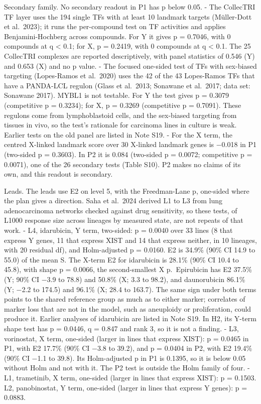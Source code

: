 \documentclass[
  11pt,
  letterpaper,
]{article}
\begin{document}
Secondary family. No secondary readout in P1 has p below 0.05. - The
CollecTRI TF layer uses the 194 single TFs with at least 10 landmark
targets (Müller-Dott et al.~2023); it runs the per-compound test on TF
activities and applies Benjamini-Hochberg across compounds. For Y it
gives p = 0.7046, with 0 compounds at q \textless{} 0.1; for X, p =
0.2419, with 0 compounds at q \textless{} 0.1. The 25 CollecTRI
complexes are reported descriptively, with panel statistics of 0.546 (Y)
and 0.653 (X) and no p value. - The focused one-sided test of TFs with
sex-biased targeting (Lopes-Ramos et al.~2020) uses the 42 of the 43
Lopes-Ramos TFs that have a PANDA-LCL regulon (Glass et al.~2013;
Sonawane et al.~2017; data set: Sonawane 2017). MYBL1 is not testable.
For Y the test gives p = 0.3079 (competitive p = 0.3234); for X, p =
0.3269 (competitive p = 0.7091). These regulons come from lymphoblastoid
cells, and the sex-biased targeting from tissues in vivo, so the test's
rationale for carcinoma lines in culture is weak. Earlier tests on the
old panel are listed in Note S19. - For the X term, the centred X-linked
landmark score over 30 X-linked landmark genes is −0.018 in P1
(two-sided p = 0.3603). In P2 it is 0.084 (two-sided p = 0.0072;
competitive p = 0.0071), one of the 26 secondary tests (Table S10). P2
makes no claims of its own, and this readout is secondary.

Leads. The leads use E2 on level 5, with the Freedman-Lane p, one-sided
where the plan gives a direction. Saha et al.~2024 derived L1 to L3 from
lung adenocarcinoma networks checked against drug sensitivity, so these
tests, of L1000 response size across lineages by measured state, are not
repeats of that work. - L4, idarubicin, Y term, two-sided: p = 0.0040
over 33 lines (8 that express Y genes, 11 that express XIST and 14 that
express neither, in 10 lineages, with 20 residual df), and Holm-adjusted
p = 0.0160. E2 is 34.9\% (90\% CI 14.9 to 55.0) of the mean S. The
X-term E2 for idarubicin is 28.1\% (90\% CI 10.4 to 45.8), with shape p
= 0.0066, the second-smallest X p.~Epirubicin has E2 37.5\% (Y; 90\% CI
−3.9 to 78.8) and 50.8\% (X; 3.3 to 98.2), and daunorubicin 86.1\% (Y;
−2.2 to 174.5) and 96.1\% (X; 28.4 to 163.7). The same sign under both
terms points to the shared reference group as much as to either marker;
correlates of marker loss that are not in the model, such as aneuploidy
or proliferation, could produce it. Earlier analyses of idarubicin are
listed in Note S19. In H2, its Y-term shape test has p = 0.0446, q =
0.847 and rank 3, so it is not a finding. - L3, vorinostat, X term,
one-sided (larger in lines that express XIST): p = 0.0465 in P1, with E2
17.7\% (90\% CI −3.8 to 39.2), and p = 0.0404 in P2, with E2 19.4\%
(90\% CI −1.1 to 39.8). Its Holm-adjusted p in P1 is 0.1395, so it is
below 0.05 without Holm and not with it. The P2 test is outside the Holm
family of four. - L1, trametinib, X term, one-sided (larger in lines
that express XIST): p = 0.1503. L2, panobinostat, Y term, one-sided
(larger in lines that express Y genes): p = 0.0883.
\end{document}

